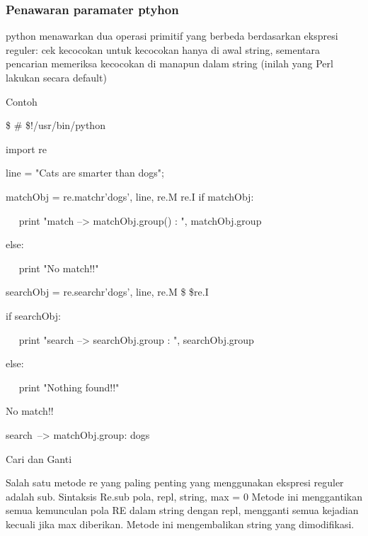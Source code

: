 \subsubsection {Penawaran paramater ptyhon}
python menawarkan dua operasi primitif yang berbeda berdasarkan ekspresi reguler: cek kecocokan untuk kecocokan hanya di awal string, sementara pencarian memeriksa kecocokan di manapun dalam string (inilah yang Perl lakukan secara default)

Contoh \par
\noindent 
 \$  \#  \$!/usr/bin/python \par
\noindent 
import re \par
\vspace{12pt}
\noindent 
line = "Cats are smarter than dogs"; \par
\begin{12pt}
\noindent 
matchObj = re.match{r'dogs', line, re.M  \vert  re.I} 
\noindent 
if matchObj: \par
\noindent 
~~ print "match --> matchObj.group() : ", matchObj.group{} \par
\noindent 
else: \par
\noindent 
~~ print "No match!!" \par
\vspace{12pt}
\noindent 
searchObj = re.search{r'dogs', line, re.M \$  \vert  \$re.I} \par
\noindent 
if searchObj: \par
\item
~~ print "search --> searchObj.group{} : ", searchObj.group{} \par
\item
else: \par
\noindent 
~~ print "Nothing found!!" \par
\vspace{12pt}
\noindent 
No match!! \par
\noindent 
search~--> matchObj.group{}:  dogs \par
\begin{12pt}
\item
Cari dan Ganti \par
\begin{12pt}
\noindent 
Salah satu metode re yang paling penting yang menggunakan ekspresi reguler adalah sub. 
\noindent 
Sintaksis 
\vspace{12pt}
Re.sub {pola, repl, string, max = 0} 
\vspace{12pt}
\noindent 
Metode ini menggantikan semua kemunculan pola RE dalam string dengan repl, mengganti semua kejadian kecuali jika max diberikan. Metode ini mengembalikan string yang dimodifikasi. \par

\end{12pt}
\end{12pt}
\end{12pt}
